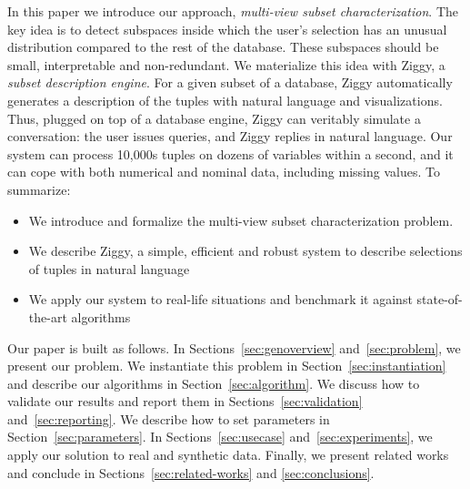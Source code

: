 In this paper we introduce our approach, \emph{multi-view subset
characterization}. The key idea is to detect subspaces inside which the user's
selection has an unusual distribution compared to the rest of the database.
These subspaces should be small, interpretable and non-redundant.  We
materialize this idea with Ziggy, a \emph{subset description engine}. For a
given subset of a database, Ziggy automatically generates a description of the
tuples with natural language and visualizations.  Thus, plugged on top of a
database engine, Ziggy can veritably simulate a conversation: the
user issues queries, and Ziggy replies in natural language. Our system can
process 10,000s tuples on dozens of variables within a second, and it can cope with
both numerical and nominal data, including missing values. To summarize:
\begin{itemize}
    \item We introduce and formalize the multi-view subset characterization problem.
    \item We describe Ziggy, a simple, efficient and robust system to describe
        selections of tuples in natural language
    \item We apply our system to real-life situations and benchmark it against
        state-of-the-art algorithms
\end{itemize}

Our paper is built as follows. In Sections~\ref{sec:genoverview}
and~\ref{sec:problem}, we present our problem. We instantiate this problem in
Section~\ref{sec:instantiation} and describe our algorithms in
Section~\ref{sec:algorithm}. We discuss how to validate our results and report
them in Sections~\ref{sec:validation} and~\ref{sec:reporting}. We describe how
to set parameters in Section~\ref{sec:parameters}. In
Sections~\ref{sec:usecase} and~\ref{sec:experiments}, we apply our solution to
real and synthetic data. Finally, we present related works and conclude in
Sections~\ref{sec:related-works} and \ref{sec:conclusions}.

